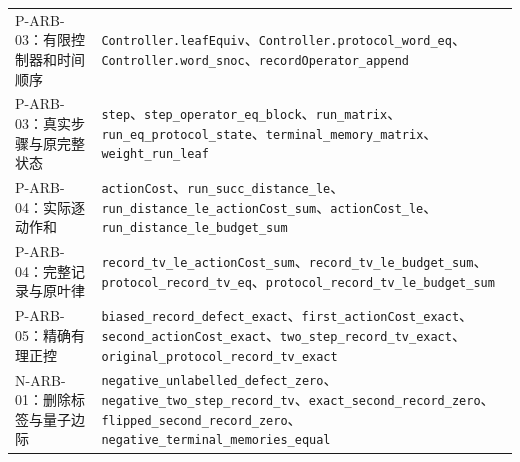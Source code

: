 \documentclass[
  11pt,
  oneside]{book}
\begin{document}
\begin{longtable}[]{@{}
  >{\raggedright\arraybackslash}p{}
  >{\raggedright\arraybackslash}p{}@{}}
P-ARB-03：有限控制器和时间顺序 &
\texttt{Controller.leafEquiv}、\allowbreak \texttt{Controller.protocol\_\allowbreak word\_\allowbreak eq}、\allowbreak \texttt{Controller.word\_\allowbreak snoc}、\allowbreak \texttt{recordOperator\_\allowbreak append} \\
P-ARB-03：真实步骤与原完整状态 &
\texttt{step}、\allowbreak \texttt{step\_\allowbreak operator\_\allowbreak eq\_\allowbreak block}、\allowbreak \texttt{run\_\allowbreak matrix}、\allowbreak \texttt{run\_\allowbreak eq\_\allowbreak protocol\_\allowbreak state}、\allowbreak \texttt{terminal\_\allowbreak memory\_\allowbreak matrix}、\allowbreak \texttt{weight\_\allowbreak run\_\allowbreak leaf} \\
P-ARB-04：实际逐动作和 &
\texttt{actionCost}、\allowbreak \texttt{run\_\allowbreak succ\_\allowbreak distance\_\allowbreak le}、\allowbreak \texttt{run\_\allowbreak distance\_\allowbreak le\_\allowbreak actionCost\_\allowbreak sum}、\allowbreak \texttt{actionCost\_\allowbreak le}、\allowbreak \texttt{run\_\allowbreak distance\_\allowbreak le\_\allowbreak budget\_\allowbreak sum} \\
P-ARB-04：完整记录与原叶律 &
\texttt{record\_\allowbreak tv\_\allowbreak le\_\allowbreak actionCost\_\allowbreak sum}、\allowbreak \texttt{record\_\allowbreak tv\_\allowbreak le\_\allowbreak budget\_\allowbreak sum}、\allowbreak \texttt{protocol\_\allowbreak record\_\allowbreak tv\_\allowbreak eq}、\allowbreak \texttt{protocol\_\allowbreak record\_\allowbreak tv\_\allowbreak le\_\allowbreak budget\_\allowbreak sum} \\
P-ARB-05：精确有理正控 &
\texttt{biased\_\allowbreak record\_\allowbreak defect\_\allowbreak exact}、\allowbreak \texttt{first\_\allowbreak actionCost\_\allowbreak exact}、\allowbreak \texttt{second\_\allowbreak actionCost\_\allowbreak exact}、\allowbreak \texttt{two\_\allowbreak step\_\allowbreak record\_\allowbreak tv\_\allowbreak exact}、\allowbreak \texttt{original\_\allowbreak protocol\_\allowbreak record\_\allowbreak tv\_\allowbreak exact} \\
N-ARB-01：删除标签与量子边际 &
\texttt{negative\_\allowbreak unlabelled\_\allowbreak defect\_\allowbreak zero}、\allowbreak \texttt{negative\_\allowbreak two\_\allowbreak step\_\allowbreak record\_\allowbreak tv}、\allowbreak \texttt{exact\_\allowbreak second\_\allowbreak record\_\allowbreak zero}、\allowbreak \texttt{flipped\_\allowbreak second\_\allowbreak record\_\allowbreak zero}、\allowbreak \texttt{negative\_\allowbreak terminal\_\allowbreak memories\_\allowbreak equal} \\
\end{longtable}
\end{document}
